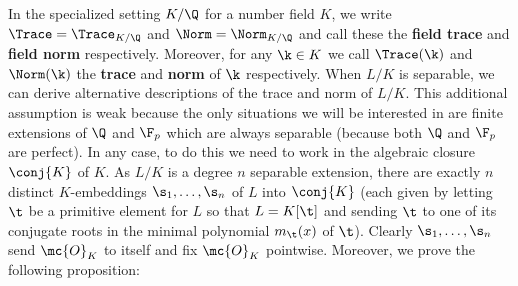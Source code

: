     In the specialized setting $K/\Q$ for a number field $K$, we write $\Trace = \Trace_{K/\Q}$ and $\Norm = \Norm_{K/\Q}$ and call these the \textbf{field trace} and \textbf{field norm} respectively. Moreover, for any $\k \in K$ we call $\Trace(\k)$ and $\Norm(\k)$ the \textbf{trace} and \textbf{norm} of $\k$ respectively. When $L/K$ is separable, we can derive alternative descriptions of the trace and norm of $L/K$. This additional assumption is weak because the only situations we will be interested in are finite extensions of $\Q$ and $\F_{p}$ which are always separable (because both $\Q$ and $\F_{p}$ are perfect). In any case, to do this we need to work in the algebraic closure $\conj{K}$ of $K$. As $L/K$ is a degree $n$ separable extension, there are exactly $n$ distinct $K$-embeddings $\s_{1},\ldots,\s_{n}$ of $L$ into $\conj{K}$ (each given by letting $\t$ be a primitive element for $L$ so that $L = K[\t]$ and sending $\t$ to one of its conjugate roots in the minimal polynomial $m_{\t}(x)$ of $\t$). Clearly $\s_{1},\ldots,\s_{n}$ send $\mc{O}_{K}$ to itself and fix $\mc{O}_{K}$ pointwise. Moreover, we prove the following proposition:

